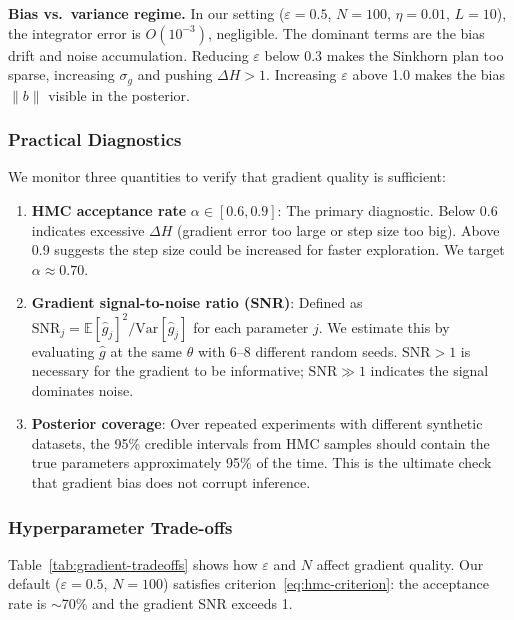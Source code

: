 \documentclass[12pt,a4paper]{article}
\theoremstyle{definition}
\theoremstyle{remark}
\newcommand{\E}{\mathbb{E}}
\begin{document}
\textbf{Bias vs.\ variance regime.} In our setting ($\varepsilon = 0.5$, $N = 100$, $\eta = 0.01$, $L = 10$), the integrator error is $O(10^{-3})$, negligible. The dominant terms are the bias drift and noise accumulation. Reducing $\varepsilon$ below 0.3 makes the Sinkhorn plan too sparse, increasing $\sigma_g$ and pushing $\Delta H > 1$. Increasing $\varepsilon$ above 1.0 makes the bias $\|b\|$ visible in the posterior.

\subsubsection{Practical Diagnostics}

We monitor three quantities to verify that gradient quality is sufficient:

\begin{enumerate}
	\item \textbf{HMC acceptance rate} $\alpha \in [0.6, 0.9]$: The primary diagnostic. Below 0.6 indicates excessive $\Delta H$ (gradient error too large or step size too big). Above 0.9 suggests the step size could be increased for faster exploration. We target $\alpha \approx 0.70$.

	\item \textbf{Gradient signal-to-noise ratio (SNR)}: Defined as $\text{SNR}_j = \E[\hat{g}_j]^2 / \text{Var}[\hat{g}_j]$ for each parameter $j$. We estimate this by evaluating $\hat{g}$ at the same $\theta$ with 6--8 different random seeds. $\text{SNR} > 1$ is necessary for the gradient to be informative; $\text{SNR} \gg 1$ indicates the signal dominates noise.

	\item \textbf{Posterior coverage}: Over repeated experiments with different synthetic datasets, the 95\% credible intervals from HMC samples should contain the true parameters approximately 95\% of the time. This is the ultimate check that gradient bias does not corrupt inference.
\end{enumerate}

\subsubsection{Hyperparameter Trade-offs}

Table~\ref{tab:gradient-tradeoffs} shows how $\varepsilon$ and $N$ affect gradient quality. Our default ($\varepsilon = 0.5$, $N = 100$) satisfies criterion~\eqref{eq:hmc-criterion}: the acceptance rate is $\sim$70\% and the gradient SNR exceeds 1.
\end{document}
